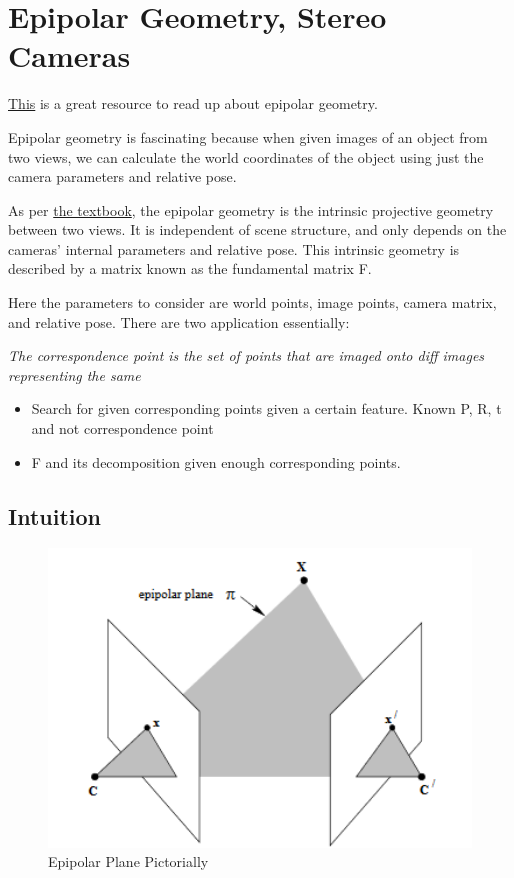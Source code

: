 \chapter{Epipolar Geometry, Stereo Cameras}

\href{https://web.stanford.edu/class/cs231a/course_notes/03-epipolar-geometry.pdf}{This} is a great resource to read up about epipolar geometry. 

Epipolar geometry is fascinating because when given images of an object from two views, we can calculate the world coordinates of the object using just the camera parameters and relative pose.

As per \href{https://github.com/pranjals16/cs676/blob/master/Hartley\%2C\%20Zisserman\%20-\%20Multiple\%20View\%20Geometry\%20in\%20Computer\%20Vision.pdf}{the textbook}, the epipolar geometry is the intrinsic projective geometry between two views.  It is independent of scene structure, and only depends on the cameras’ internal parameters and relative pose. This intrinsic geometry is described by a matrix known as the fundamental matrix F.

Here the parameters to consider are world points, image points, camera matrix, and relative pose. There are two application essentially:

\textit{The correspondence point is the set of points that are imaged onto diff images representing the same }

\begin{itemize}
    \item Search for given corresponding points given a certain feature. Known P, R, t and not correspondence point
    \item F and its decomposition given enough corresponding points.
\end{itemize}

\clearpage

\section{Intuition}

\begin{figure}
    \centering
    \includegraphics[width=12cm]{img/epipolar-1.png}
    \caption{Epipolar Plane Pictorially}
    \label{fig:epipolar}
\end{figure}

